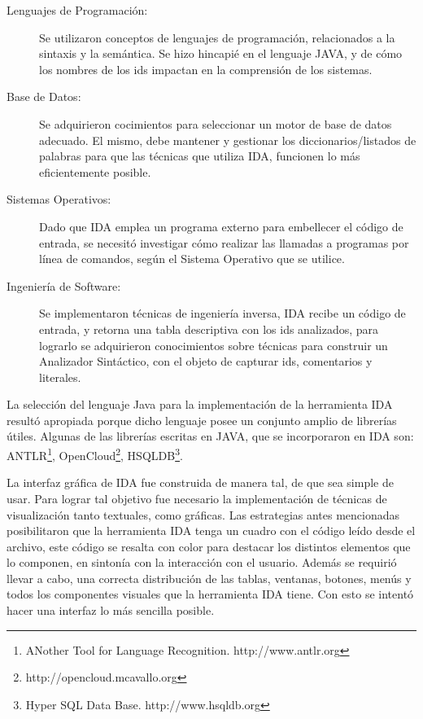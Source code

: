 \begin{description}

\item[Lenguajes de Programación:] Se utilizaron conceptos de lenguajes de programación, relacionados a la sintaxis y la semántica. Se hizo hincapié en el lenguaje JAVA, y de cómo los nombres de los ids impactan en la comprensión de los sistemas.

\item[Base de Datos:] Se adquirieron cocimientos para seleccionar un motor de base de datos adecuado. El mismo, debe mantener y gestionar los diccionarios/listados de palabras para que las técnicas que utiliza IDA, funcionen lo más eficientemente posible.

\item[Sistemas Operativos:] Dado que IDA emplea un programa externo para embellecer el código de entrada, se necesitó investigar cómo realizar las llamadas a programas por línea de comandos, según el Sistema Operativo que se utilice.


\item[Ingeniería de Software:] Se implementaron técnicas de ingeniería inversa, IDA recibe un código de entrada, y retorna una tabla descriptiva con los ids analizados, para lograrlo se adquirieron conocimientos sobre técnicas para construir un Analizador Sintáctico, con el objeto de capturar ids, comentarios y literales.

\end{description}

La selección del lenguaje Java para la implementación de la herramienta IDA resultó apropiada porque dicho lenguaje posee un conjunto amplio de librerías útiles. Algunas de las librerías escritas en JAVA, que se incorporaron en IDA son: ANTLR\footnote[1]{ANother Tool for Language Recognition. http://www.antlr.org}, OpenCloud\footnote[2]{http://opencloud.mcavallo.org}, HSQLDB\footnote[3]{Hyper SQL Data Base. http://www.hsqldb.org}.

La interfaz gráfica de IDA fue construida de manera tal, de que sea simple de usar. Para lograr tal objetivo fue necesario la implementación de técnicas de visualización tanto textuales, como gráficas. Las estrategias antes mencionadas posibilitaron que la herramienta IDA tenga un cuadro con el código leído desde el archivo, este código se resalta con color para destacar los distintos elementos que lo componen, en sintonía con la interacción con el usuario. Además se requirió llevar a cabo, una correcta distribución de las tablas, ventanas, botones, menús y todos los componentes visuales que la herramienta IDA tiene. Con esto se intentó hacer una interfaz lo más sencilla posible.


